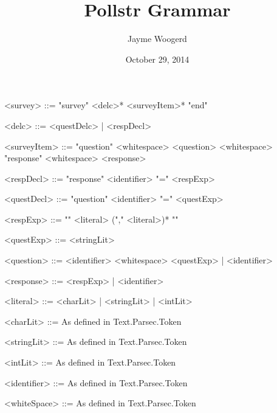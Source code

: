 \documentclass{article}
\title{Pollstr Grammar}
\author{Jayme Woogerd}
\date{October 29, 2014}
\begin{document}
\maketitle
\thispagestyle{empty}

\begin{grammar}

    <survey>     ::= "survey"  <delc>* <surveyItem>* "end"

    <delc>       ::= <questDelc> | <respDecl>

    <surveyItem> ::= "question" <whitespace> <question> <whitespace> "response" <whitespace> <response>

    <respDecl>   ::= "response" <identifier> "=" <respExp>

    <questDecl>  ::= "question" <identifier> "=" <questExp>

    <respExp>    ::= "{" <literal> ("," <literal>)* "}"

    <questExp>    ::= <stringLit>

    <question>   ::= <identifier> <whitespace> <questExp> |  <identifier>

    <response>   ::= <respExp> | <identifier>

    <literal>    ::= <charLit> | <stringLit> | <intLit>

    <charLit>    ::=  As defined in Text.Parsec.Token

    <stringLit>  ::= As defined in Text.Parsec.Token

    <intLit>     ::= As defined in Text.Parsec.Token

    <identifier> ::= As defined in Text.Parsec.Token

    <whiteSpace> ::= As defined in Text.Parsec.Token


\end{grammar}
\end{document}
